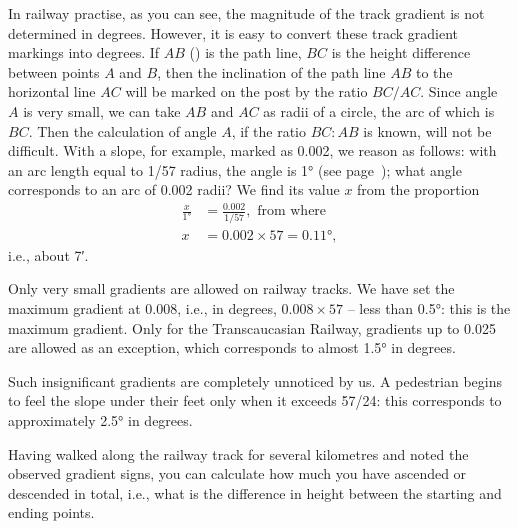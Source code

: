 In railway practise, as you can see, the magnitude of the track gradient is not determined in degrees. However, it is easy to convert these track gradient markings into degrees. If $AB$ () is the path line, $BC$ is the height difference between points $A$ and $B$, then the inclination of the path line $AB$ to the horizontal line $AC$ will be marked on the post by the ratio $BC/AC$. Since angle $A$ is very small, we can take $AB$ and $AC$ as radii of a circle, the arc of which is $BC$. Then the calculation of angle $A$, if the ratio $BC:AB$ is known, will not be difficult. With a slope, for example, marked as 0.002, we reason as follows: with an arc length equal to 1/57 radius, the angle is \ang{1} (see page~\pageref{fig-062}); what angle corresponds to an arc of 0.002 radii? We find its value $x$ from the proportion 
\begin{align*}%
\frac{x}{\ang{1}} & = \frac{0.002}{1/57},\,\, \text{from where}\\
x & = 0.002 \times 57 = \ang{0.11},
\end{align*}
i.e., about \ang{;7}.
 
Only very small gradients are allowed on railway tracks. We have set the maximum gradient at 0.008, i.e., in degrees, $0.008 \times 57$ -- less than \ang{0.5}: this is the maximum gradient. Only for the Transcaucasian Railway, gradients up to 0.025 are allowed as an exception, which corresponds to almost \ang{1.5} in degrees.

Such insignificant gradients are completely unnoticed by us. A pedestrian begins to feel the slope under their feet only when it exceeds 57/24: this corresponds to approximately \ang{2.5} in degrees.

Having walked along the railway track for several kilometres and noted the observed gradient signs, you can calculate how much you have ascended or descended in total, i.e., what is the difference in height between the starting and ending points.


